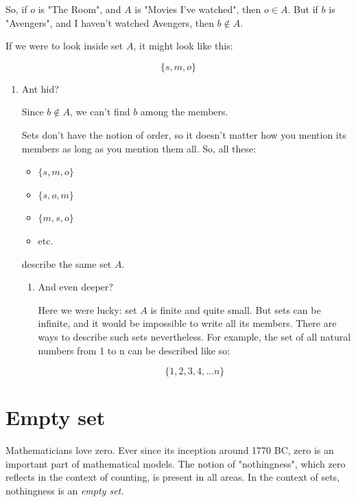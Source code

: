 \documentclass[a4paper, sfsidenotes, justified, notitlepage]{tufte-book-lite}
\begin{document}
So, if \(o\) is "The Room", and \(A\) is "Movies I've watched", then \(o \in A\). But if \(b\) is "Avengers", and I haven't watched Avengers, then \(b \notin A\).

If we were to look inside set \(A\), it might look like this:

\begin{equation}
\{s, m, o\}
\end{equation}



\begin{enumerate}
\item Ant hid?
\label{sec:orgb06ed79}

Since \(b \notin A\), we can't find \(b\) among the members.

Sets don't have the notion of order, so it doesn't matter how you mention its members as long as you mention them all. So, all these:

\begin{itemize}
\item \(\{s, m, o\}\)
\item \(\{s, o, m\}\)
\item \(\{m, s, o\}\)
\item etc.
\end{itemize}

describe the same set \(A\).


\begin{enumerate}
\item And even deeper?
\label{sec:org6d39605}

Here we were lucky: set \(A\) is finite and quite small. But sets can be infinite, and it would be impossible to write all its members. There are ways to describe such sets nevertheless. For example, the set of all natural numbers from 1 to n can be described like so:

\begin{equation}
\{1, 2, 3, 4, ... n\}
\end{equation}
\end{enumerate}
\end{enumerate}



\section{Empty set}
\label{sec:org1f25e64}

Mathematicians love zero. Ever since its inception around 1770 BC, zero is an important part of mathematical models. The notion of "nothingness", which zero reflects in the context of counting, is present in all areas. In the context of sets, nothingness is an \emph{empty set}.
\end{document}

